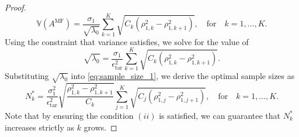 \begin{proof}
%
\begin{equation*} \label{eq:MFMC_variance2}
    \mathbb{V}\left(A^{\text{MF}}\right) = \frac{\sigma_1}{\sqrt{\lambda_0}}\sum_{k=1}^K\sqrt{C_k\left(\rho_{1,k}^2-\rho_{1,k+1}^2\right)}, \quad \text{for}\quad  k=1,\ldots,K.
\end{equation*}
%
Using the constraint that variance satisfies, we solve for the value of 
%
\[
\sqrt{\lambda_0} = \frac{\sigma_1}{\epsilon_{\text{tar}}^2}\sum_{k=1}^K\sqrt{C_k\left(\rho_{1,k}^2-\rho_{1,k+1}^2\right)}.
\]
%
Substituting $\sqrt{\lambda_0}$ into \eqref{eq:sample_size_1}, we derive the optimal sample sizes as
%
\[
N_k^* = \frac{\sigma_1^2}{\epsilon_{\text{tar}}^2}\sqrt{\frac{\rho_{1,k}^2-\rho_{1,k+1}^2}{C_k}}\sum_{j=1}^K\sqrt{C_j\left(\rho_{1,j}^2-\rho_{1,j+1}^2\right)},\quad \text{for}\quad  k=1,\ldots,K.
\]
%
Note that by ensuring the condition $(ii)$ is satisfied, we can guarantee that $N_k^*$ increases strictly as $k$ grows. 
\end{proof}
%




